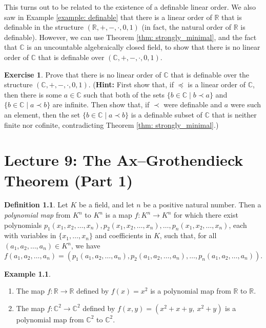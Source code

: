 \documentclass[a4paper]{memoir}
\theoremstyle{definition}
\newtheorem{definition}[theorem]{Definition}
\newtheorem{exercise}[theorem]{Exercise}
\newtheorem{example}[theorem]{Example}
\newcommand{\bb}{\mathbb}
\newcommand{\ra}{\rightarrow}
\begin{document}
This turns out to be related to the existence of a definable linear order. We also saw in 
Example \ref{example: definable} that there is a linear order of $\bb{R}$ that is definable 
in the structure $(\bb{R}, +, -, \cdot, 0, 1)$ (in fact, the natural order of $\bb{R}$ is 
definable). However, we can use Theorem \ref{thm: strongly_minimal}, and the fact that 
$\bb{C}$ is an uncountable algebraically closed field, to show that there is no linear 
order of $\bb{C}$ that is definable over $(\bb{C}, +, -, \cdot, 0, 1)$.

\begin{exercise}
  Prove that there is no linear order of $\bb{C}$ that is definable over the structure 
  $(\bb{C}, +, -, \cdot, 0, 1)$. (\textbf{Hint:} First show that, if $\preceq$ is a linear 
  order of $\bb{C}$, then there is some $a \in \bb{C}$ such that both of the sets 
  $\{b \in \bb{C} \mid b \prec a\}$ and $\{b \in \bb{C} \mid a \prec b\}$ are infinite. 
  Then show that, if $\prec$ were definable and $a$ were such an element, then the set 
  $\{b \in \bb{C} \mid a \prec b\}$ is a definable subset of $\bb{C}$ that is neither 
  finite nor cofinite, contradicting Theorem \ref{thm: strongly_minimal}.)
\end{exercise}

\chapter{Lecture 9: The Ax--Grothendieck Theorem (Part 1)}

\begin{definition}
  Let $K$ be a field, and let $n$ be a positive natural number. Then a \emph{polynomial map} 
  from $K^n$ to $K^n$ is a map $f : K^n \ra K^n$ for which there exist polynomials 
  $p_1(x_1, x_2, \ldots, x_n), p_2(x_1, x_2, \ldots, x_n), \ldots, p_n(x_1, x_2, \ldots, 
  x_n)$, each with variables in $\{x_1, \ldots, x_n\}$ and coefficients in $K$, such that, 
  for all $(a_1, a_2, \ldots, a_n) \in K^n$, we have
  \[
    f(a_1, a_2, \ldots, a_n) = (p_1(a_1, a_2, \ldots, a_n), p_2(a_1,a_2, \ldots, a_n), 
    \ldots, p_n(a_1,a_2, \ldots, a_n)).
  \]
\end{definition}

\begin{example} \label{example: polynomial_map}
  \begin{enumerate}
    \item The map $f: \bb{R} \ra \bb{R}$ defined by $f(x) = x^2$ is a polynomial map from 
    $\bb{R}$ to $\bb{R}$.
    \item The map $f: \bb{C}^2 \ra \bb{C}^2$ defined by $f(x,y) = (x^2 + x + y, \ x^2 + y)$ 
    is a polynomial map from $\bb{C}^2$ to $\bb{C}^2$.
  \end{enumerate}
\end{example}
\end{document}
